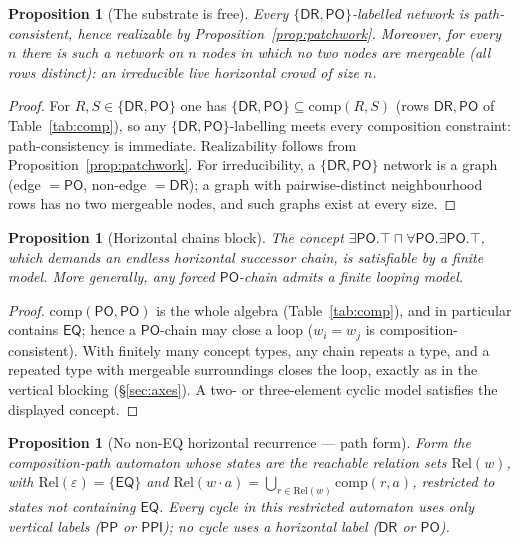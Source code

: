 \documentclass[11pt]{article}
\newcommand{\Comp}{\mathrm{comp}}
\newcommand{\DR}{\mathsf{DR}}
\newcommand{\PO}{\mathsf{PO}}
\newcommand{\PP}{\mathsf{PP}}
\newcommand{\PPI}{\mathsf{PPI}}
\newcommand{\EQ}{\mathsf{EQ}}
\theoremstyle{plain}
\newtheorem{proposition}[theorem]{Proposition}
\theoremstyle{definition}
\begin{document}
\begin{proposition}[The substrate is free]\label{prop:substrate}
Every $\{\DR,\PO\}$-labelled network is path-consistent, hence
realizable by Proposition~\ref{prop:patchwork}. Moreover, for every $n$
there is such a network on $n$ nodes in which no two nodes are
mergeable (all rows distinct): an irreducible live horizontal crowd of
size $n$.
\end{proposition}

\begin{proof}
For $R,S\in\{\DR,\PO\}$ one has $\{\DR,\PO\}\subseteq\Comp(R,S)$ (rows
$\DR,\PO$ of Table~\ref{tab:comp}), so any $\{\DR,\PO\}$-labelling meets
every composition constraint: path-consistency is immediate.
Realizability follows from Proposition~\ref{prop:patchwork}. For
irreducibility, a $\{\DR,\PO\}$ network is a graph (edge $=\PO$,
non-edge $=\DR$); a graph with pairwise-distinct neighbourhood rows has
no two mergeable nodes, and such graphs exist at every size.
\end{proof}

\begin{proposition}[Horizontal chains block]\label{prop:block}
The concept $\exists\PO.\top \sqcap \forall\PO.\exists\PO.\top$, which
demands an endless horizontal successor chain, is satisfiable by a
finite model. More generally, any forced $\PO$-chain admits a finite
looping model.
\end{proposition}

\begin{proof}
$\Comp(\PO,\PO)$ is the whole algebra
(Table~\ref{tab:comp}), and in particular contains $\EQ$; hence a
$\PO$-chain may close a loop ($w_i=w_j$ is composition-consistent). With
finitely many concept types, any chain repeats a type, and a repeated
type with mergeable surroundings closes the loop, exactly as in the
vertical blocking (\S\ref{sec:axes}). A two- or three-element cyclic
model satisfies the displayed concept.
\end{proof}

\begin{proposition}[No non-EQ horizontal recurrence --- path form]\label{prop:pathauto}
Form the composition-path automaton whose states are the reachable
relation sets $\mathrm{Rel}(w)$, with $\mathrm{Rel}(\varepsilon)=\{\EQ\}$
and $\mathrm{Rel}(w\cdot a)=\bigcup_{r\in\mathrm{Rel}(w)}\Comp(r,a)$,
restricted to states not containing $\EQ$. Every cycle in this
restricted automaton uses only vertical labels ($\PP$ or $\PPI$); no
cycle uses a horizontal label ($\DR$ or $\PO$).
\end{proposition}
\end{document}
